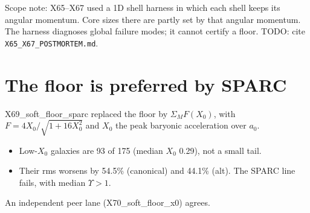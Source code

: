 \documentclass[10pt]{article}
\begin{document}
Scope note: X65--X67 used a 1D shell harness in which each shell keeps its angular momentum. Core sizes there are partly set by that angular momentum. The harness diagnoses global failure modes; it cannot certify a floor. TODO: cite \texttt{X65\_X67\_POSTMORTEM.md}.

\section{The floor is preferred by SPARC}
X69\_soft\_floor\_sparc replaced the floor by $\Sigma_M F(X_0)$, with $F=4X_0/\sqrt{1+16X_0^2}$ and $X_0$ the peak baryonic acceleration over $a_0$.
\begin{itemize}
\item Low-$X_0$ galaxies are 93 of 175 (median $X_0$ 0.29), not a small tail.
\item Their rms worsens by 54.5\% (canonical) and 44.1\% (alt). The SPARC line fails, with median $\Upsilon>1$.
\end{itemize}
An independent peer lane (X70\_soft\_floor\_x0) agrees.
\end{document}
